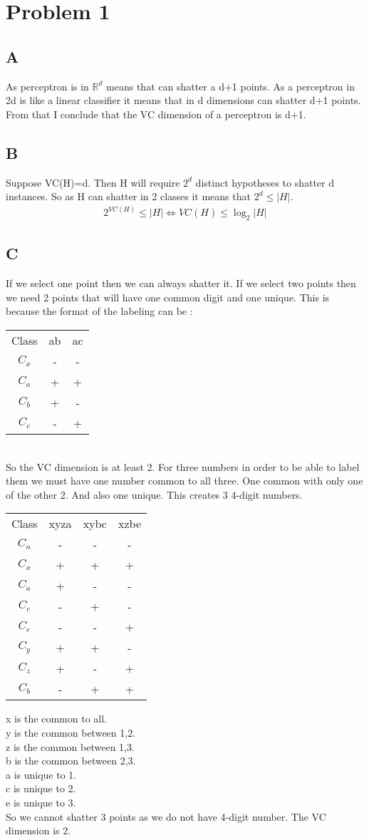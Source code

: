 \section{Problem 1}
\subsection{A}
As perceptron is in $\mathbb{R}^d$ means that can shatter a d+1
points. As a perceptron in 2d is like a linear classifier it means
that in d dimensions can shatter d+1 points. From that I conclude that 
the VC dimension of a perceptron is d+1.
\subsection{B}
Suppose VC(H)=d. Then H will require $2^d$ distinct hypotheses to shatter d instances.
So as H can shatter in 2 classes it means that $2^d \leq \lvert H\rvert$.
\begin{eqnarray}
2^{VC(H)} \leq \lvert H\rvert \Leftrightarrow
VC(H) \leq \log_2 \lvert H\rvert
\end{eqnarray}
\subsection{C}
If we select one point then we can always shatter it.
If we select two points then we need 2 points that will have one common digit and one unique.
This is because the format of the labeling can be :\\
\begin{tabular}{ c | c | c }
  Class & ab & ac  \\
  $C_x$ & - & - \\
  $C_a$ & + & + \\
  $C_b$ & + & - \\
  $C_c$ & - & + \\
\end{tabular}
\\
So the VC dimension is at least 2.
For three numbers in order to be able to label them we must have one number common
to all three. One common with only one of the other 2. And also one unique. This creates 3 4-digit numbers.\\
\begin{tabular}{ c | c | c | c }
  Class & xyza & xybc & xzbe \\
  $C_n$ & - & - & - \\
  $C_x$ & + & + & + \\
  $C_a$ & + & - & - \\
  $C_c$ & - & + & - \\
  $C_e$ & - & - & + \\
  $C_y$ & + & + & - \\
  $C_z$ & + & - & + \\
  $C_b$ & - & + & + \\
\end{tabular}

x is the common to all. \\
y is the common between 1,2. \\
z is the common between 1,3.\\
b is the common between 2,3.\\
a is unique to 1.\\
c is unique to 2.\\
e is unique to 3.\\

So we cannot shatter 3 points as we do not have 4-digit number.
The VC dimension is 2.
